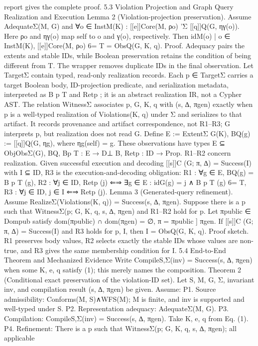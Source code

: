 report gives the complete proof.
5.3 Violation Projection and Graph Query Realization and Execution
Lemma 2 (Violation-projection preservation). Assume AdequateΣ(M, G) and
∀o ∈ InstM(K) : [[e]]Core(M, ρo) 'Σ [[q]]Q(G, ηγ(o)).
Here ρo and ηγ(o) map self to o and γ(o), respectively. Then
{idM(o) | o ∈ InstM(K), [[e]]Core(M, ρo) 6= T} = ObsQ(G, K, q).
Proof. Adequacy pairs the extents and stable IDs, while Boolean preservation retains
the condition of being different from T. The wrapper removes duplicate IDs in the final
observation.
Let TargetΣ contain typed, read-only realization records. Each p ∈ TargetΣ carries a target Boolean body, ID-projection predicate, and serialization metadata, interpreted as B
p
T
and Retp
; it is an abstract realization IR, not a Cypher AST. The relation
WitnessΣ associates p, G, K, q with (s, ∆, πgen) exactly when p is a well-typed realization of Violations(K, q) under Σ and serializes to that artifact. It records provenance
and artifact correspondence, not R1–R3; G interprets p, but realization does not read G.
Define
E := ExtentΣ
G(K), BQ(g) := [[q]]Q(G, ηg),
where ηg(self) = g. These observations have types
E ⊆ ObjObsΣ(G),
BQ, Bp
T
: E → D⊥
B, Retp
: ID → Prop.
R1–R2 concern realization. Given successful execution and decoding [[s]]C (G; π, ∆) =
Success(I) with I ⊆ ID, R3 is the execution-and-decoding obligation:
R1 : ∀g ∈ E, BQ(g) = B
p
T
(g),
R2 : ∀j ∈ ID, Retp
(j) ⇐⇒ ∃g ∈ E : idG(g) = j ∧ B
p
T
(g) 6= T,
R3 : ∀j ∈ ID, j ∈ I ⇐⇒ Retp
(j).
Lemma 3 (Generated-query refinement). Assume
RealizeΣ(Violations(K, q)) = Success(s, ∆, πgen).
Suppose there is a p such that WitnessΣ(p; G, K, q, s, ∆, πgen) and R1–R2 hold for p.
Let πpublic ∈ Dompub satisfy
dom(πpublic) ∩ dom(πgen) = ∅, π = πpublic ] πgen.
If [[s]]C (G; π, ∆) = Success(I) and R3 holds for p, I, then
I = ObsQ(G, K, q).
Proof sketch. R1 preserves body values, R2 selects exactly the stable IDs whose values
are non-true, and R3 gives the same membership condition for I.
5.4 End-to-End Theorem and Mechanized Evidence
Write CompileS,Σ(inv) = Success(s, ∆, πgen) when some K, e, q satisfy (1); this merely
names the composition.
Theorem 2 (Conditional exact preservation of the violation-ID set). Let S, M, G, Σ,
invariant inv, and compilation result (s, ∆, πgen) be given. Assume:
P1. Source admissibility: Conforms(M, S)∧WFS(M); M is finite, and inv is supported
and well-typed under S.
P2. Representation adequacy: AdequateΣ(M, G).
P3. Compilation: CompileS,Σ(inv) = Success(s, ∆, πgen). Take K, e, q from Eq. (1).
P4. Refinement: There is a p such that WitnessΣ(p; G, K, q, s, ∆, πgen); all applicable
